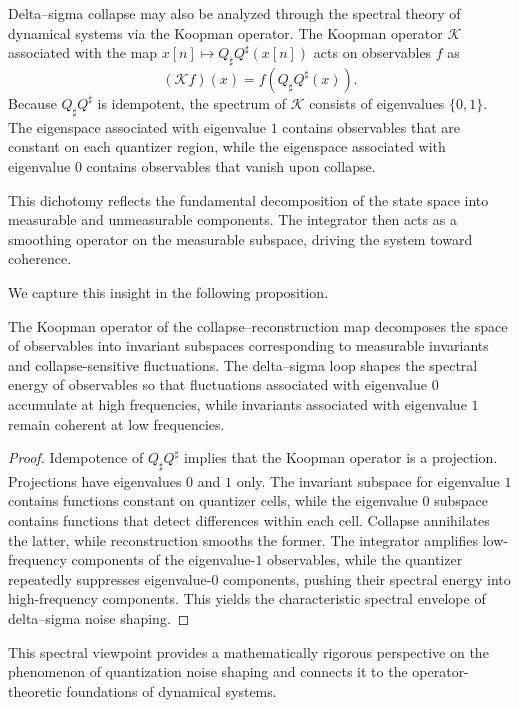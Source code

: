 Delta--sigma collapse may also be analyzed through the spectral theory of dynamical systems via the Koopman operator. The Koopman operator $\mathcal{K}$ associated with the map $x[n] \mapsto Q_{\sharp}Q^{\sharp}(x[n])$ acts on observables $f$ as
\[
(\mathcal{K} f)(x) = f(Q_{\sharp}Q^{\sharp}(x)).
\]
Because $Q_{\sharp}Q^{\sharp}$ is idempotent, the spectrum of $\mathcal{K}$ consists of eigenvalues $\{0,1\}$. The eigenspace associated with eigenvalue $1$ contains observables that are constant on each quantizer region, while the eigenspace associated with eigenvalue $0$ contains observables that vanish upon collapse.

This dichotomy reflects the fundamental decomposition of the state space into measurable and unmeasurable components. The integrator then acts as a smoothing operator on the measurable subspace, driving the system toward coherence.

We capture this insight in the following proposition.

\begin{proposition}
The Koopman operator of the collapse--reconstruction map decomposes the space of observables into invariant subspaces corresponding to measurable invariants and collapse-sensitive fluctuations. The delta--sigma loop shapes the spectral energy of observables so that fluctuations associated with eigenvalue $0$ accumulate at high frequencies, while invariants associated with eigenvalue $1$ remain coherent at low frequencies.
\end{proposition}

\begin{proof}
Idempotence of $Q_{\sharp} Q^{\sharp}$ implies that the Koopman operator is a projection. Projections have eigenvalues $0$ and $1$ only. The invariant subspace for eigenvalue $1$ contains functions constant on quantizer cells, while the eigenvalue $0$ subspace contains functions that detect differences within each cell. Collapse annihilates the latter, while reconstruction smooths the former. The integrator amplifies low-frequency components of the eigenvalue-$1$ observables, while the quantizer repeatedly suppresses eigenvalue-$0$ components, pushing their spectral energy into high-frequency components. This yields the characteristic spectral envelope of delta--sigma noise shaping.
\end{proof}

This spectral viewpoint provides a mathematically rigorous perspective on the phenomenon of quantization noise shaping and connects it to the operator-theoretic foundations of dynamical systems.

